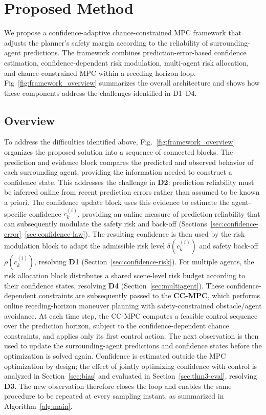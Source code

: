 \documentclass[letterpaper, 10 pt, conference]{ieeeconf}
\begin{document}
\section{Proposed Method}
\label{sec:method}

We propose a confidence-adaptive chance-constrained MPC framework that adjusts the planner's safety margin according to the reliability of surrounding-agent predictions. The framework combines prediction-error-based confidence estimation, confidence-dependent risk modulation, multi-agent risk allocation, and chance-constrained MPC within a receding-horizon loop. Fig~\ref{fig:framework_overview} summarizes the overall architecture and shows how these components address the challenges identified in D1--D4.

\subsection{Overview}
\label{sec:method-overview}

To address the difficulties identified above, Fig.~\ref{fig:framework_overview} organizes the proposed solution into a sequence of connected blocks. The prediction and evidence block compares the predicted and observed behavior of each surrounding agent, providing the information needed to construct a confidence state. This addresses the challenge in \textbf{D2}: prediction reliability must be inferred online from recent prediction errors rather than assumed to be known a priori. The confidence update block uses this evidence to estimate the agent-specific confidence $c_k^{(i)}$, providing an online measure of prediction reliability that can subsequently modulate the safety risk and back-off (Sections~\ref{sec:confidence-error}--\ref{sec:confidence-law}).
 The resulting confidence is then used by the risk modulation block to adapt the admissible risk level $\delta(c_k^{(i)})$ and safety back-off $\rho(c_k^{(i)})$, resolving \textbf{D1} (Section~\ref{sec:confidence-risk}). For multiple agents, the risk allocation block distributes a shared scene-level risk budget according to their confidence states, resolving \textbf{D4} (Section~\ref{sec:multiagent}). These confidence-dependent constraints are subsequently passed to the \textbf{CC-MPC}, which performs online receding-horizon maneuver planning with safety-constrained obstacle/agent avoidance. At each time step, the CC-MPC computes a feasible control sequence over the prediction horizon, subject to the confidence-dependent chance constraints, and applies only its first control action. The next observation is then used to update the surrounding-agent predictions and confidence states before the optimization is solved again. Confidence is estimated outside the MPC optimization by design; the effect of jointly optimizing confidence with control is analyzed in Section~\ref{sec:bias} and evaluated in Section~\ref{sec:thm3-eval}, resolving \textbf{D3}. The new observation therefore closes the loop and enables the same procedure to be repeated at every sampling instant, as summarized in Algorithm~\ref{alg:main}.
\end{document}
